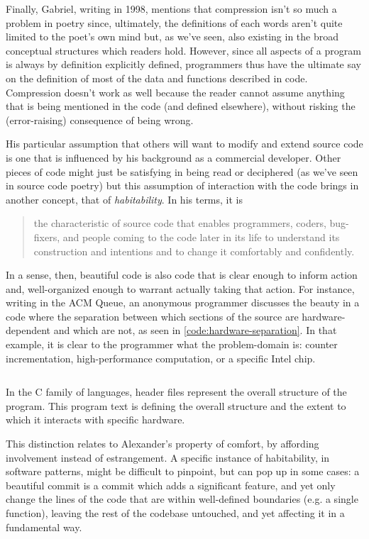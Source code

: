 Finally, Gabriel, writing in 1998, mentions that compression isn't so much a problem in poetry since, ultimately, the definitions of each words aren't quite limited to the poet's own mind but, as we've seen, also existing in the broad conceptual structures which readers hold. However, since all aspects of a program is always by definition explicitly defined, programmers thus have the ultimate say on the definition of most of the data and functions described in code. Compression doesn't work as well because the reader cannot assume anything that is being mentioned in the code (and defined elsewhere), without risking the (error-raising) consequence of being wrong.

His particular assumption that others will want to modify and extend source code is one that is influenced by his background as a commercial developer. Other pieces of code might just be satisfying in being read or deciphered (as we've seen in source code poetry) but this assumption of interaction with the code brings in another concept, that of \emph{habitability}. In his terms, it is

\begin{quote}
  the characteristic of source code that enables programmers, coders, bug-fixers, and people coming to the code later in its life to understand its construction and intentions and to change it comfortably and confidently. \citep{gabriel_patterns_1998}
\end{quote}

In a sense, then, beautiful code is also code that is clear enough to inform action and, well-organized enough to warrant actually taking that action. For instance, writing in the ACM Queue, an anonymous programmer discusses the beauty in a code where the separation between which sections of the source are hardware-dependent and which are not, as seen in \ref{code:hardware-separation}. In that example, it is clear to the programmer what the problem-domain is: counter incrementation, high-performance computation, or a specific Intel chip.

\begin{listing}
    \inputminted{rust}{./corpus/hardware_separation.h}
    \caption{In the C family of languages, header files represent the overall structure of the program. This program text is defining the overall structure and the extent to which it interacts with specific hardware.}
    \label{code:hardware-separation}
\end{listing}

This distinction relates to Alexander's property of comfort, by affording involvement instead of estrangement. A specific instance of habitability, in software patterns, might be difficult to pinpoint, but can pop up in some cases: a beautiful commit is a commit which adds a significant feature, and yet only change the lines of the code that are within well-defined boundaries (e.g. a single function), leaving the rest of the codebase untouched, and yet affecting it in a fundamental way.

